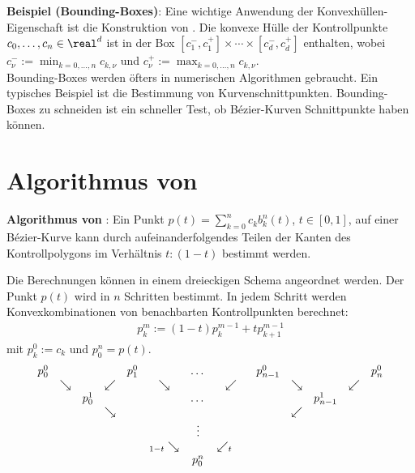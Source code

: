 \linie

\textbf{Beispiel (Bounding-Boxes)}:
Eine wichtige Anwendung der Konvexhüllen-Eigenschaft ist die Konstruktion von
.
Die konvexe Hülle der Kontrollpunkte $c_0, \dotsc, c_n \in \real^d$ ist in der Box
$[c_1^-, c_1^+] \times \dotsb \times [c_d^-, c_d^+]$ enthalten, wobei
$c_\nu^- := \min_{k=0,\dotsc,n} c_{k,\nu}$ und
$c_\nu^+ := \max_{k=0,\dotsc,n} c_{k,\nu}$.\\
Bounding-Boxes werden öfters in numerischen Algorithmen gebraucht.
Ein typisches Beispiel ist die Bestimmung von Kurvenschnittpunkten.
Bounding-Boxes zu schneiden ist ein schneller Test, ob Bézier-Kurven Schnittpunkte haben können.

\pagebreak

\section{%
    Algorithmus von %
}

\textbf{Algorithmus von }:
Ein Punkt $p(t) = \sum_{k=0}^n c_k b_k^n(t)$, $t \in [0, 1]$,
auf einer Bézier-Kurve kann durch aufeinanderfolgendes Teilen der Kanten des Kontrollpolygons
im Verhältnis $t : (1 - t)$ bestimmt werden.

Die Berechnungen können in einem dreieckigen Schema angeordnet werden.
Der Punkt $p(t)$ wird in $n$ Schritten bestimmt.
In jedem Schritt werden Konvexkombinationen von benachbarten Kontrollpunkten berechnet:
\begin{align*}
    p_k^m := (1 - t) p_k^{m-1} + t p_{k+1}^{m-1}
\end{align*}
mit $p_k^0 := c_k$ und $p_0^n = p(t)$.
\begin{align*}
    \begin{array}{ccccccccccccc}
        p_0^0 & & & & p_1^0 & & \dots & & p_{n-1}^0 & & & & p_n^0\\
        & \searrow & & \swarrow & & \searrow & & \swarrow & & \searrow & & \swarrow\\
        & & p_0^1 & & & & \dots & & & & p_{n-1}^1\\
        & & & \searrow & & & & & & \swarrow\\
        & & & & & & \vdots & & \\
        & & & & & {}_{1-t}\searrow & & \swarrow_{t\hspace{4mm}}\\
        & & & & & & p_0^n
    \end{array}
\end{align*}

